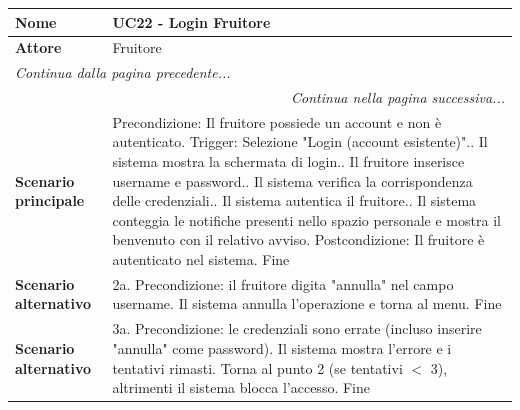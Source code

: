\documentclass[12pt, a4paper, oneside]{report}
\begin{document}
\begin{tabularx}{\textwidth}{|l|X|}
    \hline
    \textbf{Nome}               & \textbf{UC22 - Login Fruitore} \\ \hline
    \textbf{Attore}             & Fruitore \\ \hline
    \endfirsthead 
    \hline
    \multicolumn{2}{|l|}{\textit{Continua dalla pagina precedente...}} \\ \hline
    \endhead 
    \hline
    \multicolumn{2}{|r|}{\textit{Continua nella pagina successiva...}} \\ \hline
    \endfoot 
    \hline
    \endlastfoot
    \textbf{Scenario principale} & 
    Precondizione: Il fruitore possiede un account e non è autenticato.\newline
    Trigger: Selezione "Login (account esistente)".\newline
    1. Il sistema mostra la schermata di login.\newline
    2. Il fruitore inserisce username e password.\newline
    3. Il sistema verifica la corrispondenza delle credenziali.\newline
    4. Il sistema autentica il fruitore.\newline
    5. Il sistema conteggia le notifiche presenti nello spazio personale e mostra il benvenuto con il relativo avviso.\newline
    Postcondizione: Il fruitore è autenticato nel sistema.\newline
    Fine \\ \hline
    \textbf{Scenario alternativo} & 
    2a. Precondizione: il fruitore digita "annulla" nel campo username.\newline
    Il sistema annulla l'operazione e torna al menu.\newline
    Fine \\ \hline
    \textbf{Scenario alternativo} & 
    3a. Precondizione: le credenziali sono errate (incluso inserire "annulla" come password).\newline
    Il sistema mostra l'errore e i tentativi rimasti.\newline
    Torna al punto 2 (se tentativi $<$ 3), altrimenti il sistema blocca l'accesso.\newline
    Fine \\ \hline
\end{tabularx}

\renewcommand{\arraystretch}{1.4} 
\end{document}
